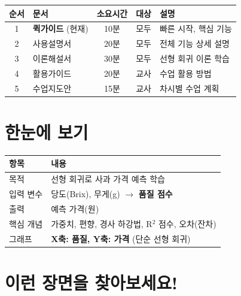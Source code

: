 \documentclass[11pt, a4paper]{article}
\begin{document}
\begin{center}
\begin{tabular}{clccl}
    \toprule
    \textbf{순서} & \textbf{문서} & \textbf{소요시간} & \textbf{대상} & \textbf{설명} \\
    \midrule
    1 & \textbf{퀵가이드} (현재) & 10분 & 모두 & 빠른 시작, 핵심 기능 \\
    2 & 사용설명서 & 20분 & 모두 & 전체 기능 상세 설명 \\
    3 & 이론해설서 & 30분 & 모두 & 선형 회귀 이론 학습 \\
    4 & 활용가이드 & 20분 & 교사 & 수업 활용 방법 \\
    5 & 수업지도안 & 15분 & 교사 & 차시별 수업 계획 \\
    \bottomrule
\end{tabular}
\end{center}

\section{ 한눈에 보기}

\begin{center}
\begin{tabular}{lp{10cm}}
    \toprule
    \textbf{항목} & \textbf{내용} \\
    \midrule
    목적 & 선형 회귀로 사과 가격 예측 학습 \\
    입력 변수 & 당도(Brix), 무게(g) $\rightarrow$ \textbf{품질 점수} \\
    출력 & 예측 가격(원) \\
    핵심 개념 & 가중치, 편향, 경사 하강법, R$^2$ 점수, 오차(잔차) \\
    그래프 & \textbf{X축: 품질, Y축: 가격} (단순 선형 회귀) \\
    \bottomrule
\end{tabular}
\end{center}

\section{ 이런 장면을 찾아보세요!}
\end{document}
